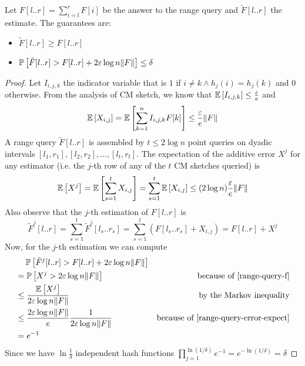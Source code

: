 Let $F[l..r]=\sum_{i=l}^rF[i]$ be the answer to the range query and $\tilde{F}[l..r]$ the estimate. The guarantees are:
\begin{itemize}
  \item $\tilde{F}[l..r] \geq F[l..r]$
  \item $\operatorname*{\mathbb{P}}\left[{\tilde{F}[l..r] > F[l..r]+2\varepsilon\log n\lVert F\rVert}\right] \leq \delta$
\end{itemize}

\begin{proof}
  Let $I_{i,j,k}$ the indicator variable that is $1$ if $i \ne k \wedge h_j(i)=h_j(k)$ and $0$ otherwise. From the analysis of CM sketch, we know that
  $\mathbb{E}\left[{I_{i,j,k}}\right] \leq \frac{\varepsilon}{e} $
  and
  $$\mathbb{E}\left[{X_{i,j}}\right] = \mathbb{E}\left[{\sum_{k=1}^n I_{i,j,k}F[k]}\right] \leq \frac{\varepsilon}{e}\lVert F\rVert$$
  A range query $\tilde{F}[l..r]$ is assembled by  $t \leq 2\log n$ point queries on dyadic intervals $[l_1,r_1], [l_2,r_2], \dots, [l_t,r_t]$. 
  The expectation of the additive error $X^j$ for any estimator (i.e. the $j$-th row of any of the $t$ CM sketches queried) is
  \begin{equation}
    \mathbb{E}\left[{X^j}\right] = \mathbb{E}\left[{\sum_{s=1}^tX_{i,j}}\right]=\sum_{s=1}^t\mathbb{E}\left[{X_{i,j}}\right] \leq (2\log n) \frac{\varepsilon}{e}\lVert F\rVert
    \label{range-query-error-expect}
  \end{equation}
  Also observe that the $j$-th estimation of $F[l..r]$ is
  \begin{equation}
    \tilde{F}^j[l..r]= \sum_{s=1}^t \tilde{F}^j[l_s..r_s] = \sum_{s=1}^t (F[l_s..r_s] + X_{i,j}) = F[l..r]+X^j
    \label{range-query-f}
  \end{equation}
  Now, for the $j$-th estimation we can compute
  \begin{align*}
    &\phantom{={}} \prob{\tilde{F}^j[l..r] > F[l..r]+2\varepsilon\log n\norm{F}} & \\
    &= \prob{X^j > 2\varepsilon\log n\norm{F}} & \text{because of \eqref{range-query-f}} \\
    &\leq \frac{\E{X^j}}{2\varepsilon\log n\norm{F}} & \text{by the Markov inequality} \\
    &\leq  \frac{2\varepsilon\log n\norm{F}}{e} \frac{1}{2\varepsilon\log n\norm{F}} & \text{because of \eqref{range-query-error-expect}} \\
    &= e^{-1} &
  \end{align*}
  Since we have $\ln\frac{1}{\delta}$ independent hash functions $\prod_{j=1}^{\ln(1/\delta)}e^{-1}=e^{-\ln(1/\delta)}=\delta$
\end{proof}

